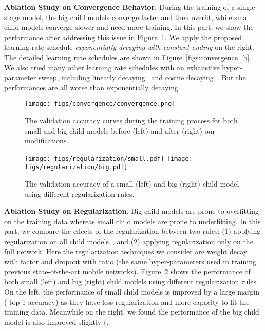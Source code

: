 \documentclass[runningheads]{llncs}
\begin{document}
\textbf{Ablation Study on Convergence Behavior.}
During the training of a single-stage model, the big child models converge faster and then overfit, while small child models converge slower and need more training. In this part, we show the performance after addressing this issue in Figure~\ref{figs:ablation_convergence}. We apply the proposed learning rate schedule \textit{exponentially decaying with constant ending} on the right. The detailed learning rate schedules are shown in Figure~\ref{figs:convergence_b}. We also tried many other learning rate schedules with an exhaustive hyper-parameter sweep, including linearly decaying~\cite{ma2018shufflenet, yu2019universally} and cosine decaying~\cite{loshchilov2016sgdr, he2019bag}. But the performances are all worse than exponentially decaying.

\begin{figure}[hb]
\centering
\texttt{[image: figs/convergence/convergence.png]}
\caption{The validation accuracy curves during the training process for both small and big child models before (left) and after (right) our modifications.}
\label{figs:ablation_convergence}
\end{figure}

\begin{figure}[ht]
\centering
\texttt{[image: figs/regularization/small.pdf]}
\texttt{[image: figs/regularization/big.pdf]}
\caption{The validation accuracy of a small (left) and big (right) child model using different regularization rules.}
\label{figs:regularization}
\end{figure}

\textbf{Ablation Study on Regularization.}
Big child models are prone to overfitting on the training data whereas small child models are prone to underfitting. In this part, we compare the effects of the regularization between two rules: (1) applying regularization on all child models~\cite{bender2018understanding}, and (2) applying regularization only on the full network. Here the regularization techniques we consider are weight decay with factor  and dropout with ratio  (the same hyper-parameters used in training previous state-of-the-art mobile networks). Figure~\ref{figs:regularization} shows the performance of both small (left) and big (right) child models using different regularization rules. On the left, the performance of small child models is improved by a large margin ( top-1 accuracy) as they have less regularization and more capacity to fit the training data. Meanwhile on the right, we found the performance of the big child model is also improved slightly (.
\end{document}
